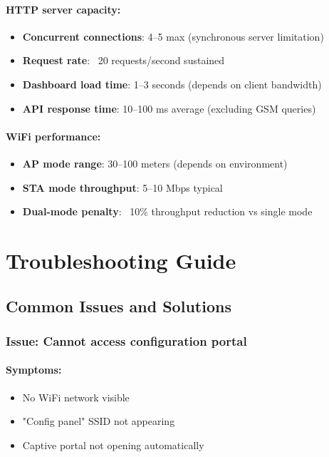 \documentclass[11pt,a4paper]{article}
\begin{document}
\paragraph{HTTP server capacity:}
\begin{itemize}[leftmargin=*]
  \item \textbf{Concurrent connections}: 4--5 max (synchronous server limitation)
  \item \textbf{Request rate}: ~20 requests/second sustained
  \item \textbf{Dashboard load time}: 1--3 seconds (depends on client bandwidth)
  \item \textbf{API response time}: 10--100 ms average (excluding GSM queries)
\end{itemize}

\paragraph{WiFi performance:}
\begin{itemize}[leftmargin=*]
  \item \textbf{AP mode range}: 30--100 meters (depends on environment)
  \item \textbf{STA mode throughput}: 5--10 Mbps typical
  \item \textbf{Dual-mode penalty}: ~10\% throughput reduction vs single mode
\end{itemize}

\section{Troubleshooting Guide}

\subsection{Common Issues and Solutions}

\subsubsection{Issue: Cannot access configuration portal}

\paragraph{Symptoms:}
\begin{itemize}[leftmargin=*]
  \item No WiFi network visible
  \item "Config panel" SSID not appearing
  \item Captive portal not opening automatically
\end{itemize}
\end{document}
